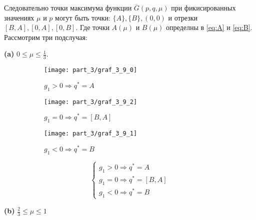 \begin{flushleft}
	
	Следовательно точки максимума функции $\overline{G}(p,q,\mu)$ при фикисированных
	значениях $\mu$ и $p$ могут быть точки: 
	$\{A\}, \{B\}, (0,0)$ и отрезки $[B, A], [0, A], [0,B]$. Где точки
	$A(\mu)$ и $B(\mu)$ определны в \ref{eq:A} и \ref{eq:B}. 
	Рассмотрим три подслучая:
	
	\newpage

	\textbf{(a)} $0 \leqslant \mu \leqslant \frac{1}{3}$. 	
		
	\begin{figure}[H]
    	\centering
     	\begin{subfigure}[b]{0.3 \textwidth}
        	\centering
        	\texttt{[image: part\_3/graf\_3\_9\_0]}
        	\caption{$g_1 > 0 \Rightarrow q^*=A$}
         	\label{fig:y equals x}
     	\end{subfigure}
     	\begin{subfigure}[b]{0.3 \textwidth}
        	\centering
        	\texttt{[image: part\_3/graf\_3\_9\_2]}
        	\caption{$g_1 = 0 \Rightarrow q^*=[B,A]$}
        	\label{fig:three sin x}
     	\end{subfigure}
     	\begin{subfigure}[b]{0.3 \textwidth}
        	\centering
        	\texttt{[image: part\_3/graf\_3\_9\_1]}
        	\caption{$g_1 < 0 \Rightarrow q^*=B$}
        	\label{fig:three sin x}
     	\end{subfigure}
     	\caption{}
     	\label{fig:3_mu_0}
	\end{figure}

	
	$$
		\begin{cases}
			g_1 > 0 \Rightarrow q^*=A \\
			g_1 = 0 \Rightarrow q^*=[B,A] \\
			g_1 < 0 \Rightarrow q^*=B
		\end{cases}
	$$	
	
	\textbf{(b)} $\frac{2}{3} \leqslant \mu \leqslant 1$
			

\end{flushleft}
